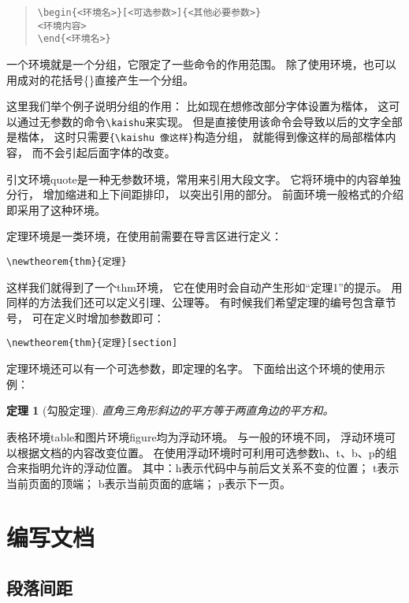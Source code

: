 \documentclass{ctexart}
\newtheorem{thm}{定理}[section]
\begin{document}
	\begin{quote}
		\verb|\begin{<环境名>}[<可选参数>]{<其他必要参数>}|  \\
		\verb|<环境内容>|	\\
		\verb|\end{<环境名>}| 
	\end{quote}
	
	一个环境就是一个分组，它限定了一些命令的作用范围。
	除了使用环境，也可以用成对的花括号\{\}直接产生一个分组。
	
	这里我们举个例子说明分组的作用：
	比如现在想修改部分字体设置为楷体，
	这可以通过无参数的命令\verb|\kaishu|来实现。
	但是直接使用该命令会导致以后的文字全部是楷体，
	这时只需要\verb|{\kaishu 像这样}|构造分组，
	就能得到{\kaishu 像这样}的局部楷体内容，
	而不会引起后面字体的改变。
	
	引文环境quote是一种无参数环境，常用来引用大段文字。
	它将环境中的内容单独分行，
	增加缩进和上下间距排印，
	以突出引用的部分。
	前面环境一般格式的介绍即采用了这种环境。
	
	定理环境是一类环境，在使用前需要在导言区进行定义：
	
	\verb|\newtheorem{thm}{定理}|
	
	这样我们就得到了一个thm环境，
	它在使用时会自动产生形如“定理1”的提示。
	用同样的方法我们还可以定义引理、公理等。
	有时候我们希望定理的编号包含章节号，
	可在定义时增加参数即可：
	
	\verb|\newtheorem{thm}{定理}[section]|
	
	定理环境还可以有一个可选参数，即定理的名字。
	下面给出这个环境的使用示例：
	
	\begin{thm}[勾股定理]
		直角三角形斜边的平方等于两直角边的平方和。
	\end{thm}
	
	表格环境table和图片环境figure均为浮动环境。
	与一般的环境不同，
	浮动环境可以根据文档的内容改变位置。
	在使用浮动环境时可利用可选参数h、t、b、p的组合来指明允许的浮动位置。
	其中：h表示代码中与前后文关系不变的位置；
	t表示当前页面的顶端；
	b表示当前页面的底端；
	p表示下一页。
	
	
	
	\section{编写文档}
	\subsection{段落间距}
\end{document}
